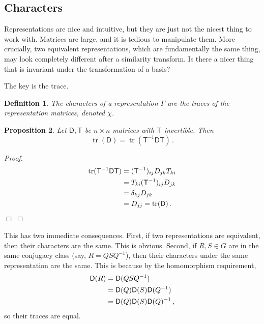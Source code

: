 \documentclass{article}
\theoremstyle{plain}\theoremheaderfont{\normalfont\itshape}\theorembodyfont{\rmfamily}\theoremseparator{.}\newtheorem*{rem}{Remark}\newtheorem*{ex}{Example}\newtheorem*{proof}{Proof}\newtheorem*{altp}{Alternative proof}
\theoremstyle{plain}\theoremheaderfont{\normalfont\bfseries}\theorembodyfont{\rmfamily}\theoremseparator{.}\newtheorem{thm}{Theorem}[section]\newtheorem{lem}[thm]{Lemma}\newtheorem{prop}[thm]{Proposition}\newtheorem*{cor}{Corollary}\newtheorem{defn}[thm]{Definition}\newtheorem{clm}[thm]{Claim}\newtheorem{clminproof}{Claim}\newtheorem*{law}{Law}\newtheorem{pos}[thm]{Postulate}
\theoremstyle{break}\theoremheaderfont{\normalfont\itshape}\theorembodyfont{\rmfamily}\theoremseparator{.\medskip}\newtheorem*{proofskip}{Proof}\newtheorem*{exs}{Examples}\newtheorem*{rems}{Remarks}
\theoremstyle{break}\theoremheaderfont{\normalfont\bfseries}\theorembodyfont{\rmfamily}\theoremseparator{.\medskip}\newtheorem{lemskip}[thm]{Lemma}\newtheorem{defnskip}[thm]{Definition}\newtheorem{propskip}[thm]{Proposition}\newtheorem{thmskip}[thm]{Theorem}
\numberwithin{equation}{section}
\newcommand{\qed}{\hfill\ensuremath{\Box}}
\newcommand{\DD}{\mathsf{D}}
\newcommand{\TT}{\mathsf{T}}
\DeclareMathOperator{\tr}{tr}
\begin{document}
    \subsection{Characters}
    Representations are nice and intuitive, but they are just not the nicest thing to work with. Matrices are large, and it is tedious to manipulate them. More crucially, two equivalent representations, which are fundamentally the same thing, may look completely different after a similarity transform. Is there a nicer thing that is invariant under the transformation of a basis?

    The key is the trace.

    \begin{defn}
        The \textit{characters} of a representation \(\Gamma\) are the traces of the representation matrices, denoted \(\chi\).
    \end{defn}
    \begin{prop}
        Let \(\DD,\TT\) be \(n\times n\) matrices with \(\TT\) invertible. Then
        \begin{equation}
            \tr(\DD)=\tr(\TT^{-1}\DD\TT)\,.
        \end{equation}
    \end{prop}
    \begin{proof}
        \begin{align}
            \tr(\TT^{-1}\DD\TT)&=(\TT^{-1})_{ij}D_{jk}T_{ki}\notag\\
            &=T_{ki}(\TT^{-1})_{ij}D_{jk}\notag\\
            &=\delta_{kj}D_{jk}\notag\\
            &=D_{jj}=\tr(\DD)\,.
        \end{align}\qed
    \end{proof}
    This has two immediate consequences. First, if two representations are equivalent, then their characters are the same. This is obvious. Second, if \(R,S\in G\) are in the same conjugacy class (say, \(R=QSQ^{-1}\)), then their characters under the same representation are the same. This is because by the homomorphism requirement,
    \begin{align}
        \DD(R)&=\DD(QSQ^{-1})\notag\\
        &=\DD(Q)\DD(S)\DD(Q^{-1})\notag\\
        &=\DD(Q)\DD(S)\DD(Q)^{-1}\,,
    \end{align}
    so their traces are equal.
    
\end{document}
